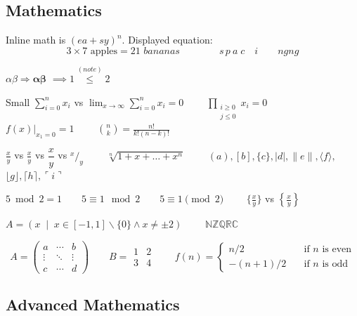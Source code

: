 {    \subsection*{Mathematics}
    
    Inline math is $(ea+sy)^n$. Displayed equation:
    \[
    3\times7\text{ apples}=21\textit{ bananas}
    \qquad\qquad
    s\,p\:a\;c\quad i\qquad ng n\!g
    \]
    
    $\alpha\beta\Rightarrow\bm{\alpha\beta}$
    $\implies 1\overset{(note)}{\leq}2$

    Small $\sum_{i=0}^n x_i$ vs
    $\displaystyle \lim_{x \to \infty}\sum_{i=0}^{n}x_i=0 \qquad$
    $\displaystyle\prod_{\substack{i\ge0\\j\le0}}x_i=0 \qquad$
    $f(x)|_{x_1=0}=1 \qquad$
    $\binom{n}{k}=\frac{n!}{k!(n-k)!}$
    
    $\frac{x}{y}$ vs $\tfrac{x}{y}$ vs $\dfrac{x}{y}$ vs $^x/_y \qquad$
    $\sqrt[n]{1+x+\dots+x^n}\qquad$
    $(a),[b],\{c\},|d|,\|e\|,\langle f \rangle,$
    $\lfloor g \rfloor,\lceil h \rceil,\ulcorner i \urcorner$
    
    $5 \bmod 2=1 \qquad 5 \equiv 1 \mod 2 \qquad 5 \equiv 1 \pmod 2 \qquad$
    $\{\frac{x}{y}\}$ vs $\left\{\frac{x}{y}\right\}$
    
    $A=\left(x\;\middle|\;x\in[-1,1]\backslash\{0\} \land x\neq\pm2\right)$
    $\qquad \mathbb{N}\mathbb{Z}\mathbb{Q}\mathbb{R}\mathbb{C}$
    
    \[A=
    \begin{pmatrix}
        a & \cdots & b\\
        \vdots & \ddots & \vdots\\
        c & \cdots & d
    \end{pmatrix}
    \qquad B=
    \begin{array}{c|c}
        1 & 2\\
        \hline
        3 & 4
    \end{array}
    \qquad f(n)=
    \begin{cases}
        n/2       & \quad \text{if } n \text{ is even}\\
        -(n+1)/2  & \quad \text{if } n \text{ is odd}
    \end{cases}
    \]
    
    \subsection*{Advanced Mathematics}
    
}
